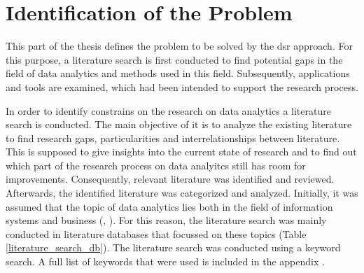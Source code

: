 \section{Identification of the Problem}\label{sec:identification_of_the_problem}


This part of the thesis defines the problem to be solved by the \ac{dsr} approach. For this purpose, a literature search is first conducted to find potential gaps in the field of data analytics and methods used in this field. Subsequently, applications and tools are examined, which had been intended to support the research process.

In order to identify constrains on the research on data analytics a literature search is conducted. The main objective of it is to analyze the existing literature to find research gaps, particularities and interrelationships between literature. This is supposed to give insights into the current state of research and to find out which part of the research process on data analyitcs still has room for improvements. %
Consequently, relevant literature was identified and reviewed. Afterwards, the identified literature was categorized and analyzed. Initially, it was assumed that the topic of data analytics lies both in the field of information systems and business (\cite{Abbasi.2016}, \cite{Levina.2005}). For this reason, the literature search was mainly conducted in literature databases that focussed on these topics (Table \ref{literature_search_db}).%
The literature search was conducted using a keyword search. %
A full list of keywords that were used is included in the appendix . %

